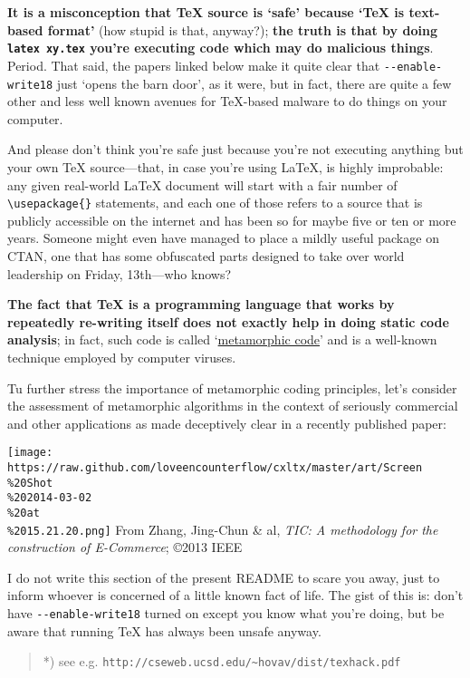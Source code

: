 \textbf{It is a misconception that TeX source is `safe' because `TeX is
text-based format'} (how stupid is that, anyway?); \textbf{the truth is
that by doing \texttt{latex xy.tex} you're executing code which may do
malicious things}. Period. That said, the papers linked below make it
quite clear that \texttt{-{}-enable-write18} just `opens the barn door',
as it were, but in fact, there are quite a few other and less well known
avenues for TeX-based malware to do things on your computer.

And please don't think you're safe just because you're not executing
anything but your own TeX source---that, in case you're using LaTeX, is
highly improbable: any given real-world LaTeX document will start with a
fair number of \texttt{\textbackslash{}usepackage\{\}} statements, and
each one of those refers to a source that is publicly accessible on the
internet and has been so for maybe five or ten or more years. Someone
might even have managed to place a mildly useful package on CTAN, one
that has some obfuscated parts designed to take over world leadership on
Friday, 13th---who knows?

\textbf{The fact that TeX is a programming language that works by
repeatedly re-writing itself does not exactly help in doing static code
analysis}; in fact, such code is called
`\href{http://en.wikipedia.org/wiki/Metamorphic_code}{metamorphic code}'
and is a well-known technique employed by computer viruses.

Tu further stress the importance of metamorphic coding principles, let's
consider the assessment of metamorphic algorithms in the context of
seriously commercial and other applications as made deceptively clear in
a recently published paper:

\texttt{[image: https://raw.github.com/loveencounterflow/cxltx/master/art/Screen\\\%20Shot\\\%202014-03-02\\\%20at\\\%2015.21.20.png]}
From Zhang, Jing-Chun \& al, \emph{TIC: A methodology for the
construction of E-Commerce}; ©2013 IEEE

I do not write this section of the present README to scare you away,
just to inform whoever is concerned of a little known fact of life. The
gist of this is: don't have \texttt{-{}-enable-write18} turned on except
you know what you're doing, but be aware that running TeX has always
been unsafe anyway.

\begin{quote}
*) see e.g.
\texttt{http://cseweb.ucsd.edu/\textasciitilde{}hovav/dist/texhack.pdf}
\end{quote}

